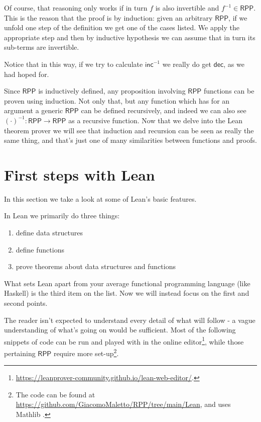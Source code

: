 \documentclass{book}
\theoremstyle{definition}
\theoremstyle{remark}
\theoremstyle{plain}
\newcommand{\RPP}{\mathsf{RPP}}
\newcommand{\rppinc}{\mathsf{inc}}
\newcommand{\rppdec}{\mathsf{dec}}
\begin{document}
Of course, that reasoning only works if in turn $f$ is also invertible and $f^{-1} \in \RPP$.
This is the reason that the proof is by induction:
given an arbitrary $\RPP$, if we unfold one step of the definition we get one of the cases listed.
We apply the appropriate step and then by inductive hypothesis we can assume that in turn its sub-terms are invertible.

Notice that in this way, if we try to calculate $\rppinc^{-1}$ we really do get $\rppdec$, as we had hoped for.

Since $\RPP$ is inductively defined, any proposition involving $\RPP$ functions can be proven using induction.
Not only that, but any function which has for an argument a generic $\RPP$ can be defined recursively,
and indeed we can also see $(\cdot)^{-1}:\RPP \to \RPP$ as a recursive function.
Now that we delve into the Lean theorem prover we will see that induction and recursion can be seen as really the same thing,
and that's just one of many similarities between functions and proofs.

\section{First steps with Lean}

In this section we take a look at some of Lean's basic features.

In Lean we primarily do three things:
\begin{enumerate}
\item define data structures
\item define functions
\item prove theorems about data structures and functions
\end{enumerate}
What sets Lean apart from your average functional programming language (like Haskell) is the third item on the list.
Now we will instead focus on the first and second points.

The reader isn't expected to understand every detail of what will follow -
a vague understanding of what's going on would be sufficient.
Most of the following snippets of code can be run and played with
in the online editor\footnote{\url{https://leanprover-community.github.io/lean-web-editor/}.},
while those pertaining $\RPP$ require more set-up\footnote{The code can be found at \url{https://github.com/GiacomoMaletto/RPP/tree/main/Lean},
and uses Mathlib \cite{mathlib}.}.
\end{document}
